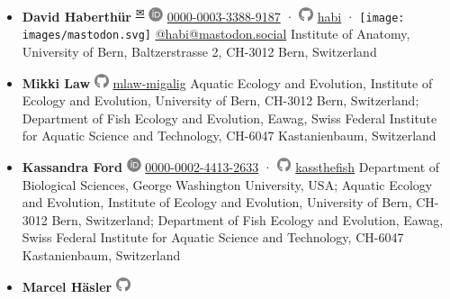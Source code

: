 \begin{itemize}
\item
  \textbf{David Haberthür}
  \textsuperscript{\protect\hyperlink{correspondence}{✉}}
  \includegraphics[width=0.16667in,height=0.16667in]{images/orcid.svg}
  \href{https://orcid.org/0000-0003-3388-9187}{0000-0003-3388-9187} ·
  \includegraphics[width=0.16667in,height=0.16667in]{images/github.svg}
  \href{https://github.com/habi}{habi}
  · \texttt{[image: images/mastodon.svg]}
  \href{https://mastodon.social/@habi}{@habi@mastodon.social}
  Institute of Anatomy, University of Bern, Baltzerstrasse 2, CH-3012 Bern, Switzerland
\item
  \textbf{Mikki Law}
  \includegraphics[width=0.16667in,height=0.16667in]{images/github.svg}
  \href{https://github.com/mlaw-migalig}{mlaw-migalig}
  Aquatic Ecology and Evolution, Institute of Ecology and Evolution, University of Bern, CH-3012 Bern, Switzerland; Department of Fish Ecology and Evolution, Eawag, Swiss Federal Institute for Aquatic Science and Technology, CH-6047 Kastanienbaum, Switzerland
\item
  \textbf{Kassandra Ford}
  \includegraphics[width=0.16667in,height=0.16667in]{images/orcid.svg}
  \href{https://orcid.org/0000-0002-4413-2633}{0000-0002-4413-2633} ·
  \includegraphics[width=0.16667in,height=0.16667in]{images/github.svg}
  \href{https://github.com/kassthefish}{kassthefish}
  Department of Biological Sciences, George Washington University, USA; Aquatic Ecology and Evolution, Institute of Ecology and Evolution, University of Bern, CH-3012 Bern, Switzerland; Department of Fish Ecology and Evolution, Eawag, Swiss Federal Institute for Aquatic Science and Technology, CH-6047 Kastanienbaum, Switzerland
\item
  \textbf{Marcel Häsler}
  \includegraphics[width=0.16667in,height=0.16667in]{images/github.svg}

\end{itemize}
